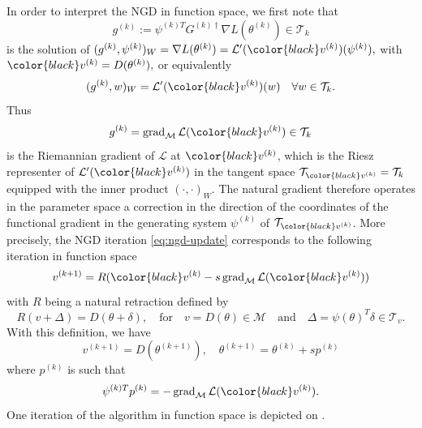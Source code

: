 \documentclass{article}
\theoremstyle{noparens}
\newcommand{\cL}{\mathcal{L}}
\newcommand{\cT}{\mathcal{T}}
\newcommand{\cM}{\mathcal{M}}
\newcommand{\colorM}{\color{black}}
\newcommand{\paramk}{\theta^{(k)}}
\newcommand{\vk}{{\colorM v^{(k)}}}
\newcommand{\psik}{\psi^{(k)}}
\newcommand{\psikT}{\psi^{(k)T}}
\newcommand{\Ginvk}{{G^{(k)\dagger}}}
\newcommand{\gradM}{\operatorname{grad}_{\cM}}
\begin{document}
In order to interpret the NGD in function space, we first note that
$$
g^{(k)} := \psikT \Ginvk \nabla L(\theta^{(k)}) \in \cT_k
$$
is the solution of
$
(g^{(k)} , \psik)_W = \nabla L(\paramk) = \cL'(\vk)(\psik)
,$
with $\vk = D(\paramk),$ or equivalently
$$
(g^{(k)} , w)_W = \cL'(\vk)(w) \quad \forall w \in \cT_k.
$$
Thus $$g^{(k)} = \gradM \cL(\vk) \in \cT_k$$ is the Riemannian gradient of $\cL$ at $\vk$, which is the Riesz representer of $\cL'(\vk)$ in the tangent space  $\cT_{\vk} = \cT_k  $ equipped with the inner product $(\cdot,\cdot)_W$. The natural gradient therefore operates in the parameter space a correction in the direction of the coordinates of the functional gradient in the generating system $\psik$ of $\cT_{\vk}$. More precisely, the NGD iteration \eqref{eq:ngd-update} corresponds to the following iteration in function space
$$
v^{(k+1)} = R(\vk - s \gradM \cL(\vk))
$$
with $R$ being a natural retraction defined by
\begin{equation}
R(v + \Delta) = D(\theta + \delta), \quad \text{for} \quad  v = D(\theta)\in \cM \quad \text{and} \quad  \Delta  = \psi(\theta)^T \delta \in \cT_v . \label{eq:retraction}
\end{equation}
With this definition, we have
\begin{equation*}
v^{(k+1)} = D(\theta^{(k+1)}), \quad \theta^{(k+1)} = \theta^{(k)} + s p^{(k)}
\end{equation*}
where $p^{(k)}$ is such that
$$
\psikT p^{(k)} = - \gradM \cL(\vk).
$$
One iteration of the algorithm in function space is depicted on .
\end{document}

